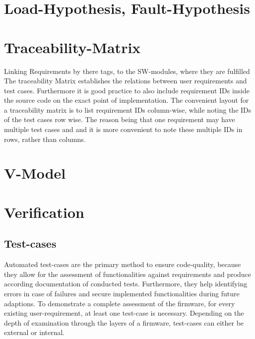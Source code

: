 	


	\section{Load-Hypothesis, Fault-Hypothesis}
	\section{Traceability-Matrix}
	Linking Requirements by there tags, to the SW-modules, where they are fulfilled
	The traceability Matrix establishes the relations between user requirements and test cases. Furthermore it is good practice to also include requirement IDs inside the source code on the exact point of implementation. The convenient layout for a traceability matrix is to list requirement IDs column-wise, while noting the IDs of the test cases row wise. The reason being that one requirement may have multiple test cases and and it is more convenient to note these multiple IDs in rows, rather than columns.
	\section{V-Model}

	\section{Verification}
	\subsection{Test-cases}
	Automated test-cases are the primary method to ensure code-quality, because they allow for the assessment of functionalities against requirements and produce according documentation of conducted tests. Furthermore, they help identifying  errors in case of failures and secure implemented functionalities during future adaptions. To demonstrate a complete assessment of the firmware, for every existing user-requirement, at least one test-case is necessary. Depending on the depth of examination through the layers of a firmware, test-cases can either be external or internal. \\
	

